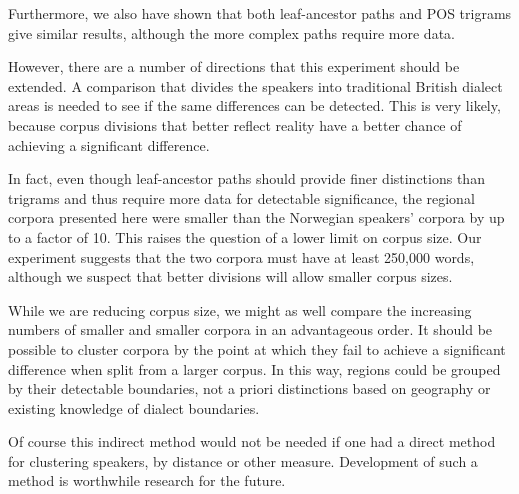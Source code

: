 \documentclass[11pt]{article}
\begin{document}
Furthermore, we also have shown that both leaf-ancestor paths and POS
trigrams give similar results, although the more complex paths require more data.

However, there are a number of directions that this experiment should
be extended. A comparison that divides the speakers into traditional
British dialect areas is needed to see if the same differences can be
detected. This is very likely, because corpus divisions that better
reflect reality have a better chance of achieving a significant difference.

In fact, even though leaf-ancestor paths should provide finer
distinctions than trigrams and thus require more data for detectable
significance, the regional corpora presented here were smaller than
the Norwegian speakers' corpora \cite{nerbonne06} by up to a factor of
10. This raises the question of a lower limit on corpus size. Our
experiment suggests that the two corpora must have at least 250,000 words,
although we suspect that better divisions will allow smaller corpus sizes.

While we are reducing corpus size, we might as well compare the
increasing numbers of smaller and smaller corpora in an advantageous
order. It should be possible to cluster corpora by the point at which
they fail to achieve a significant difference when split from a
larger corpus. In this way, regions could be
grouped by their detectable boundaries, not a priori distinctions
based on geography or existing knowledge of dialect boundaries.

Of course this indirect method would not be needed if one had a direct
method for clustering speakers, by distance or other
measure. Development of such a method is worthwhile research for the future.




\end{document}
